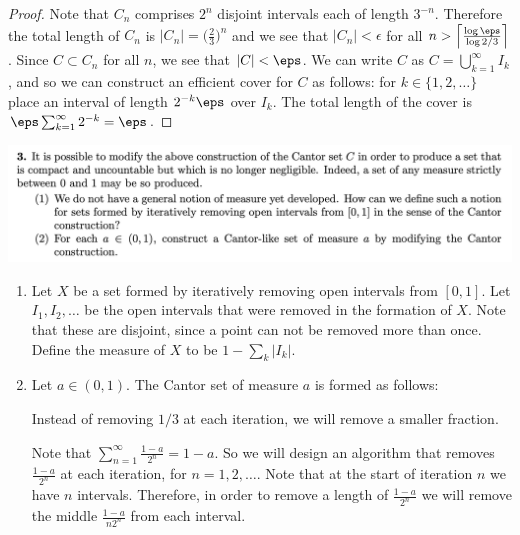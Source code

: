 \begin{enumerate}[label=(2.\arabic*)]
\begin{proof}
    Note that $C_n$ comprises $2^n$ disjoint intervals each of length $3^{-n}$. Therefore the total length
    of $C_n$ is $|C_n| = \big(\frac{2}{3}\big)^n$ and we see that $|C_n| < \epsilon$ for
    all $n > \Big\lceil\frac{\log\eps}{\log 2/3} \Big\rceil$. Since $C \subset C_n$ for all $n$, we see
    that $|C| < \eps$. We can write $C$ as $C = \bigcup_{k=1}^\infty I_k$, and so we can construct an efficient
    cover for $C$ as follows: for $k \in \{1, 2, \ldots\}$ place an interval of length $2^{-k}\eps$ over $I_k$.
    The total length of the cover is $\eps\sum_{k=1}^\infty 2^{-k} = \eps$.

  \end{proof}

\end{enumerate}

\newpage
\begin{mdframed}
  \includegraphics[width=400pt]{img/analysis--berkeley-202a-6b7a.png}
\end{mdframed}

\begin{enumerate}[label=(3.\arabic*)]

\item
  \begin{definition*}
    Let $X$ be a set formed by iteratively removing open intervals from $[0, 1]$. Let $I_1, I_2, \ldots$ be the
    open intervals that were removed in the formation of $X$. Note that these are disjoint, since a point can
    not be removed more than once. Define the measure of $X$ to be $1 - \sum_k |I_k|$.
  \end{definition*}

\item
  \begin{definition*}
    Let $a \in (0, 1)$. The Cantor set of measure $a$ is formed as follows:

    Instead of removing $1/3$ at each iteration, we will remove a smaller fraction.

    Note that $\sum_{n=1}^\infty \frac{1 - a}{2^n} = 1 - a$. So we will design an algorithm that
    removes $\frac{1-a}{2^n}$ at each iteration, for $n=1, 2, \ldots$. Note that at the start of iteration $n$
    we have $n$ intervals. Therefore, in order to remove a length of $\frac{1-a}{2^n}$ we will remove the
    middle $\frac{1-a}{n2^n}$ from each interval.
  \end{definition*}
\end{enumerate}



